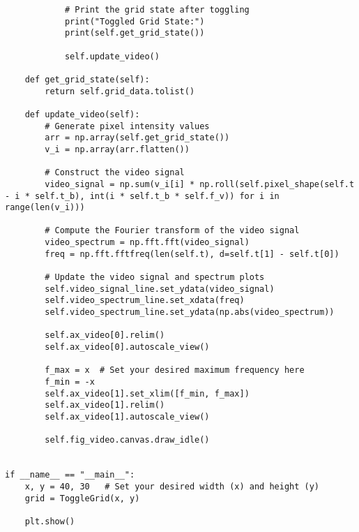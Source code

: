 \documentclass{article}
\begin{document}
\begin{lstlisting}
            # Print the grid state after toggling
            print("Toggled Grid State:")
            print(self.get_grid_state())

            self.update_video()

    def get_grid_state(self):
        return self.grid_data.tolist()

    def update_video(self):
        # Generate pixel intensity values
        arr = np.array(self.get_grid_state())
        v_i = np.array(arr.flatten())
    
        # Construct the video signal
        video_signal = np.sum(v_i[i] * np.roll(self.pixel_shape(self.t - i * self.t_b), int(i * self.t_b * self.f_v)) for i in range(len(v_i)))
    
        # Compute the Fourier transform of the video signal
        video_spectrum = np.fft.fft(video_signal)
        freq = np.fft.fftfreq(len(self.t), d=self.t[1] - self.t[0])
    
        # Update the video signal and spectrum plots
        self.video_signal_line.set_ydata(video_signal)
        self.video_spectrum_line.set_xdata(freq)
        self.video_spectrum_line.set_ydata(np.abs(video_spectrum))
    
        self.ax_video[0].relim()
        self.ax_video[0].autoscale_view()
    
        f_max = x  # Set your desired maximum frequency here
        f_min = -x
        self.ax_video[1].set_xlim([f_min, f_max])
        self.ax_video[1].relim()
        self.ax_video[1].autoscale_view()
    
        self.fig_video.canvas.draw_idle()


if __name__ == "__main__":
    x, y = 40, 30   # Set your desired width (x) and height (y)
    grid = ToggleGrid(x, y)

    plt.show()


\end{lstlisting}
\end{document}
